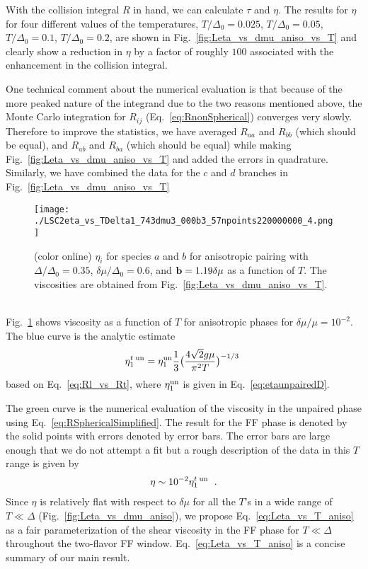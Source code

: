 \documentclass[10pt, aps, prd, superscriptaddress, nofootinbib, 
               amsmath, amssymb, twocolumn,
               preprintnumbers, showpacs,
               raggedbottom,
               floatfix]{revtex4-1}
\newcommand{\bfb}{{\bf{b}}}
\newcommand{\un}{{\rm{un}}}
\begin{document}
With the collision integral $R$ in hand, we can calculate $\tau$ and $\eta$.
The results for $\eta$ for four different values of the temperatures,
$T/\Delta_0=0.025$, $T/\Delta_0=0.05$, $T/\Delta_0=0.1$, $T/\Delta_0=0.2$, are
shown in Fig.~\ref{fig:Leta_vs_dmu_aniso_vs_T} and clearly show a reduction in
$\eta$ by a factor of roughly $100$ associated with the enhancement in the
collision integral. 

One technical comment about the numerical evaluation is that because of the 
more peaked nature of the integrand due to the two reasons mentioned above, the Monte Carlo integration 
for $R_{ij}$ (Eq.~\ref{eq:RnonSpherical}) converges very slowly.
Therefore to improve the statistics, we have averaged $R_{aa}$ and $R_{bb}$
(which should be equal), and $R_{ab}$ and $R_{ba}$ (which should be equal)
while making Fig.~\ref{fig:Leta_vs_dmu_aniso_vs_T} and added the errors in
quadrature. Similarly, we have combined the data for the $c$ and $d$ branches
in Fig.~\ref{fig:Leta_vs_dmu_aniso_vs_T}  

\begin{figure*}[tbp]
\texttt{[image: ./LSC2eta\_vs\_TDelta1\_743dmu3\_000b3\_57npoints220000000\_4.png]}
  \caption{(color online) $\eta_i$ for species $a$ and $b$ for anisotropic
  pairing with $\Delta/\Delta_0=0.35$, $\delta\mu/\Delta_0=0.6$, and
  $\bfb=1.19\delta\mu$ as a function of $T$. The viscosities are obtained from
  Fig.~\ref{fig:Leta_vs_dmu_aniso_vs_T}.
  ~\label{fig:Leta_vs_T_aniso} } \end{figure*}

Fig.~\ref{fig:Leta_vs_T_aniso} shows viscosity as a function of $T$ for
anisotropic phases for $\delta\mu/\mu=10^{-2}$. The blue curve is the analytic
estimate
\begin{equation}
\begin{split}
\eta^{t\;\un}_{1} = \eta_{1}^{\un} \frac{1}{3}\bigl(\frac{4\sqrt{2}g\mu}{\pi^2
T}\bigr)^{-1/3}
~\label{eq:etal_vs_etat}
\end{split}
\end{equation}
based on Eq.~\ref{eq:Rl_vs_Rt}, where $\eta_{1}^{\un}$ is given in
Eq.~\ref{eq:etaunpairedD}.

The green curve is the numerical evaluation of the viscosity in the unpaired
phase using Eq.~\ref{eq:RSphericalSimplified}. The result for the FF phase is
denoted by the solid points with errors denoted by error bars. The error bars
are large enough that we do not attempt a fit but a rough description of the
data in this $T$ range is given by
\begin{equation}
\begin{split}
\eta \sim 10^{-2}\eta^{t\;\un}_{1}~\label{eq:Leta_vs_T_aniso}\;.
\end{split}
\end{equation}
Since $\eta$ is relatively flat with respect to $\delta\mu$ for all the $T$'s in
a wide range of $T\ll\Delta$ (Fig.~\ref{fig:Leta_vs_dmu_aniso}), we propose 
Eq.~\ref{eq:Leta_vs_T_aniso} as a fair parameterization of the shear
viscosity in the FF phase for $T\ll\Delta$ throughout the two-flavor FF window.
Eq.~\ref{eq:Leta_vs_T_aniso} is a concise summary of our main result.
\end{document}
